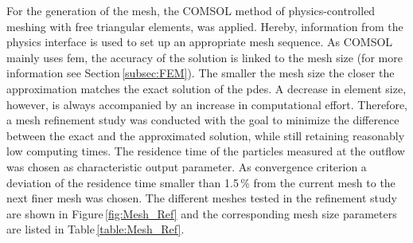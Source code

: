 For the generation of the mesh, the COMSOL method of physics-controlled meshing with free triangular elements, was applied. Hereby, information from the physics interface is used to set up an appropriate mesh sequence. As COMSOL mainly uses \gls{fem}, the accuracy of the solution is linked to the mesh size (for more information see Section\,\ref{subsec:FEM}). The smaller the mesh size the closer the approximation matches the exact solution of the \glspl{pde}. A decrease in element size, however, is always accompanied by an increase in computational effort. Therefore, a mesh refinement study was conducted with the goal to minimize the difference between the exact and the approximated solution, while still retaining reasonably low computing times. The residence time of the particles measured at the outflow was chosen as characteristic output parameter. As convergence criterion a deviation of the residence time smaller than 1.5\,\% from the current mesh to the next finer mesh was chosen. The different meshes tested in the refinement study are shown in Figure\,\ref{fig:Mesh_Ref} and the corresponding mesh size parameters are listed in Table\,\ref{table:Mesh_Ref}.  

